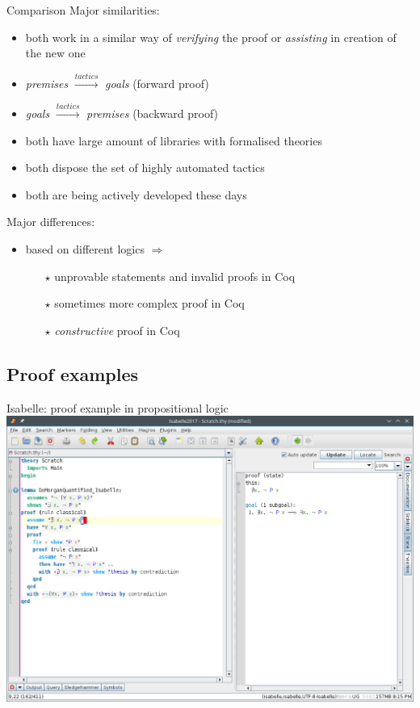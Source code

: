 \documentclass[aspectratio=169, fleqn]{beamer}
\begin{document}
\begin{frame}{Comparison}
\textcolor{dkblue}{Major similarities:}
\begin{itemize}
  \item both work in a similar way of \textit{verifying} the proof or \textit{assisting} in creation of the new one
  \item \textit{premises} $\xrightarrow{tactics}$ \textit{goals} (forward proof)
  \item \textit{goals} $\xrightarrow{tactics}$ \textit{premises} (backward proof)
  \item both have large amount of libraries with formalised theories
  \item both dispose the set of highly automated tactics
  \item both are being actively developed these days
\end{itemize}

\vspace{10pt}
\textcolor{dkblue}{Major differences:}
\begin{itemize}
  \item based on different logics $\Rightarrow$
  \begin{itemize}
    \item[$\star$] unprovable statements and invalid proofs in Coq
    \item[$\star$] sometimes more complex proof in Coq
    \item[$\star$] \textit{constructive} proof in Coq
    
  \end{itemize}
\end{itemize}

\end{frame}


\subsection{Proof examples}

\begin{frame}
{Isabelle: proof example in propositional logic}
\includegraphics[scale=0.39]{img/isabelle_morgan.png}
\end{frame}
\end{document}
